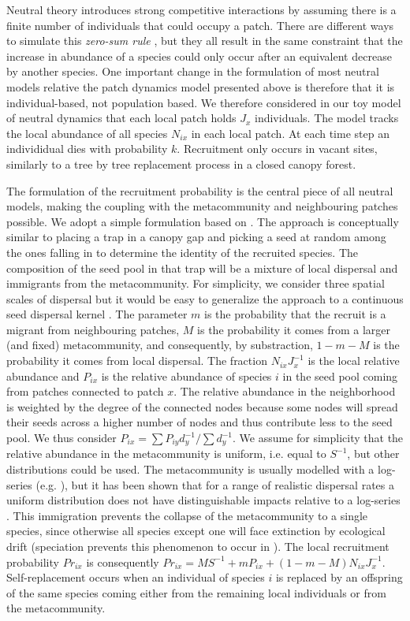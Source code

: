 \documentclass[12pt]{article}
\begin{document}
Neutral theory introduces strong competitive interactions by assuming there is a
finite number of individuals that could occupy a patch. There are different ways
to simulate this \emph{zero-sum rule} \parencite{Bell2000,Hubbell2001}, but they
all result in the same constraint that the increase in abundance of a species
could only occur after an equivalent decrease by another species. One important
change in the formulation of most neutral models relative the patch dynamics
model presented above is therefore that it is individual-based, not population
based. We therefore considered in our toy model of neutral dynamics that each
local patch holds $J_x$ individuals. The model tracks the local abundance of all
species $N_{ix}$ in each local patch. At each time step an individidual dies
with probability $k$. Recruitment only occurs in vacant sites, similarly to a
tree by tree replacement process in a closed canopy forest.

The formulation of the recruitment probability is the central piece of all
neutral models, making the coupling with the metacommunity and
neighbouring patches possible. We adopt a simple formulation based on
\parencite{Gravel2006}. The approach is conceptually similar to placing a trap
in a canopy gap and picking a seed at random among the ones falling in to
determine the identity of the recruited species. The composition of the seed
pool in that trap will be a mixture of local dispersal and immigrants from the
metacommunity. For simplicity, we consider three spatial scales of dispersal but
it would be easy to generalize the approach to a continuous seed dispersal
kernel \parencite{Gravel2006}. The parameter $m$ is the probability that the
recruit is a migrant from neighbouring patches, $M$ is the probability it comes
from a larger (and fixed) metacommunity, and consequently, by substraction,
$1-m-M$ is the probability it comes from local dispersal. The fraction
$N_{ix}J_x^{-1}$ is the local relative abundance and $P_{ix}$ is the relative
abundance of species $i$ in the seed pool coming from patches connected to patch $x$.
The relative abundance in the neighborhood is weighted by the degree of the
connected nodes because some nodes will spread their seeds across a higher
number of nodes and thus contribute less to the seed pool. We thus consider
$P_{ix} =\sum P_{iy}d_y^{-1}/\sum d_y^{-1}$. We assume for simplicity
that the relative abundance in the metacommunity is uniform, i.e. equal to
$S^{-1}$, but other distributions could be used. The metacommunity is usually
modelled with a log-series (e.g. \textcite{Hubbell2001}), but it has been shown
that for a range of realistic dispersal rates a uniform distribution does not
have distinguishable impacts relative to a log-series \parencite{Bell2000}. This
immigration prevents the collapse of the metacommunity to a single species,
since otherwise all species except one will face extinction by ecological drift
(speciation prevents this phenomenon to occur in \textcite{Hubbell2001}). The
local recruitment probability $Pr_{ix}$ is consequently $Pr_{ix} = MS^{-1} +
mP_{ix} + (1-m-M)N_{ix}J_x^{-1}$. Self-replacement occurs when an individual of
species $i$ is replaced by an offspring of the same species coming either from
the remaining local individuals or from the metacommunity.
\end{document}
